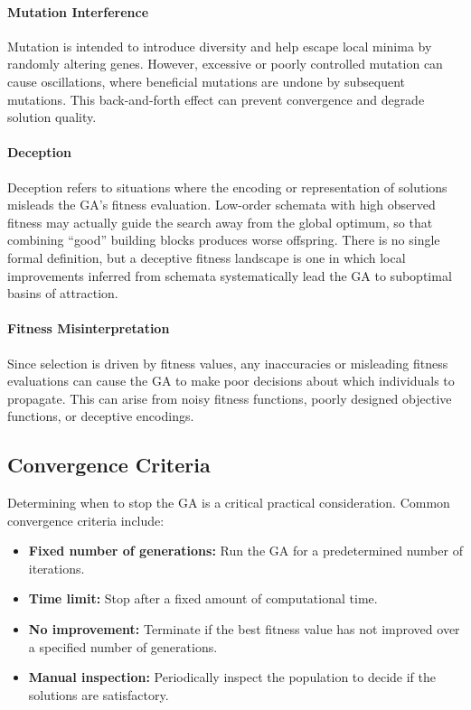 \paragraph{Mutation Interference}
Mutation is intended to introduce diversity and help escape local minima by randomly altering genes. However, excessive or poorly controlled mutation can cause oscillations, where beneficial mutations are undone by subsequent mutations. This back-and-forth effect can prevent convergence and degrade solution quality.

\paragraph{Deception}
Deception refers to situations where the encoding or representation of solutions misleads the GA's fitness evaluation. Low-order schemata with high observed fitness may actually guide the search away from the global optimum, so that combining ``good'' building blocks produces worse offspring. There is no single formal definition, but a deceptive fitness landscape is one in which local improvements inferred from schemata systematically lead the GA to suboptimal basins of attraction.

\paragraph{Fitness Misinterpretation}
Since selection is driven by fitness values, any inaccuracies or misleading fitness evaluations can cause the GA to make poor decisions about which individuals to propagate. This can arise from noisy fitness functions, poorly designed objective functions, or deceptive encodings.

\subsection{Convergence Criteria}
\label{sec:evo_convergence_criteria}

Determining when to stop the GA is a critical practical consideration. Common convergence criteria include:

\begin{itemize}
    \item \textbf{Fixed number of generations:} Run the GA for a predetermined number of iterations.
    \item \textbf{Time limit:} Stop after a fixed amount of computational time.
    \item \textbf{No improvement:} Terminate if the best fitness value has not improved over a specified number of generations.
    \item \textbf{Manual inspection:} Periodically inspect the population to decide if the solutions are satisfactory.
\end{itemize}

